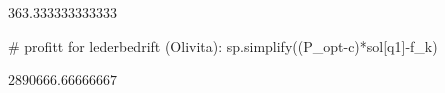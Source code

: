 \documentclass[
  12pt,
  a4paper,
  DIV=11,
  numbers=noendperiod]{scrartcl}
\newenvironment{Shaded}{\begin{snugshade}}{\end{snugshade}}
\newcommand{\CommentTok}[1]{\textcolor[rgb]{0.37,0.37,0.37}{#1}}
\newcommand{\NormalTok}[1]{\textcolor[rgb]{0.00,0.23,0.31}{#1}}
\newcommand{\OperatorTok}[1]{\textcolor[rgb]{0.37,0.37,0.37}{#1}}
\begin{document}
$\displaystyle 363.333333333333$

\begin{Shaded}
\begin{Highlighting}[]
\CommentTok{\# profitt for lederbedrift (Olivita):}
\NormalTok{sp.simplify((P\_opt}\OperatorTok{{-}}\NormalTok{c)}\OperatorTok{*}\NormalTok{sol[q1]}\OperatorTok{{-}}\NormalTok{f\_k)}
\end{Highlighting}
\end{Shaded}

$\displaystyle 2890666.66666667$
\end{document}
